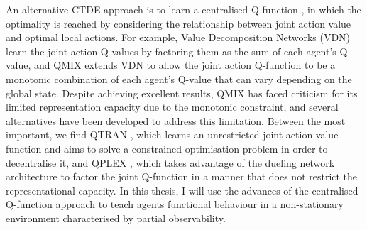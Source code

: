 \documentclass[a4paper,singleside,12pt]{report} %
\begin{document}
An alternative CTDE approach is to learn a centralised Q-function \cite{AAMAS2018VDN, Rashid2018QMIXMV, Son2019QTRANLT, Yang2020QattenAG, Wang2020QPLEXDD}, in which the optimality is reached by considering the relationship between joint action value and optimal local actions. For example, Value Decomposition Networks (VDN) \cite{AAMAS2018VDN} learn the joint-action Q-values by factoring them as the sum of each agent's Q-value, and QMIX \cite{Rashid2018QMIXMV} extends VDN to allow the joint action Q-function to be a monotonic combination of each agent's Q-value that can vary depending on the global state. Despite achieving excellent results, QMIX has faced criticism for its limited representation capacity due to the monotonic constraint, and several alternatives have been developed to address this limitation. Between the most important, we find QTRAN \cite{Son2019QTRANLT}, which learns an unrestricted joint action-value function and aims to solve a constrained optimisation problem in order to decentralise it, and QPLEX \cite{Wang2020QPLEXDD}, which takes advantage of the dueling network architecture to factor the joint Q-function in a manner that does not restrict the representational capacity. In this thesis, I will use the advances of the centralised Q-function approach to teach agents functional behaviour in a non-stationary environment characterised by partial observability.
\end{document}
